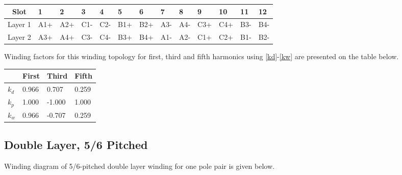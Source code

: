 \documentclass{reportClass}
\begin{document}
 \begin{table}[h!] \centering
\begin{tabular}{|c|l|l|l|l|l|l|l|l|l|l|l|l|}
\hline
Slot    & 1                           & 2                           & 3                           & 4                           & 5                           & 6                           & 7                           & 8                           & 9                           & 10                          & 11                          & 12                          \\ \hline
Layer 1 & \cellcolor[HTML]{FCFF2F}A1+ & \cellcolor[HTML]{FCFF2F}A2+ & \cellcolor[HTML]{CBCEFB}C1- & \cellcolor[HTML]{CBCEFB}C2- & \cellcolor[HTML]{90E3FB}B1+ & \cellcolor[HTML]{90E3FB}B2+ & \cellcolor[HTML]{FCFF2F}A3- & \cellcolor[HTML]{FCFF2F}A4- & \cellcolor[HTML]{CBCEFB}C3+ & \cellcolor[HTML]{CBCEFB}C4+ & \cellcolor[HTML]{90E3FB}B3- & \cellcolor[HTML]{90E3FB}B4- \\ \hline
Layer 2 & \cellcolor[HTML]{FCFF2F}A3+ & \cellcolor[HTML]{FCFF2F}A4+ & \cellcolor[HTML]{CBCEFB}C3- & \cellcolor[HTML]{CBCEFB}C4- & \cellcolor[HTML]{90E3FB}B3+ & \cellcolor[HTML]{90E3FB}B4+ & \cellcolor[HTML]{FCFF2F}A1- & \cellcolor[HTML]{FCFF2F}A2- & \cellcolor[HTML]{CBCEFB}C1+ & \cellcolor[HTML]{CBCEFB}C2+ & \cellcolor[HTML]{90E3FB}B1- & \cellcolor[HTML]{90E3FB}B2- \\ \hline
\end{tabular}
\end{table}


Winding factors for this winding topology for first, third and fifth harmonics using \ref{kd}-\ref{kw} are presented on the table below.

\begin{table}[h!] \centering
\begin{tabular}{|l|l|l|l|}
\hline
   & First & Third  & Fifth \\ \hline
$k_d$ & 0.966 & 0.707  & 0.259 \\ \hline
$k_p$ & 1.000 & -1.000 & 1.000 \\ \hline
$k_w$ & 0.966 & -0.707 & 0.259 \\ \hline
\end{tabular}
\end{table}


\subsection{Double Layer, 5/6 Pitched}

Winding diagram of 5/6-pitched double layer winding for one pole pair is given below.
\end{document}
